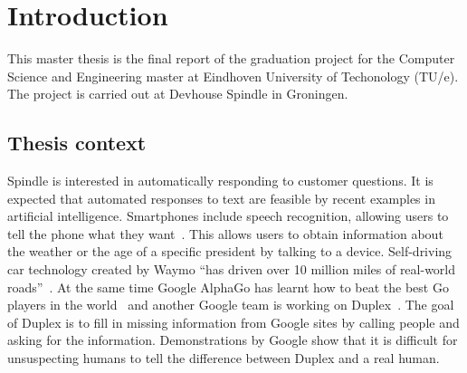 \chapter{Introduction}
\label{ch:introduction}

\setcounter{page}{0}
This master thesis is the final report of the graduation project for the Computer Science and Engineering master at Eindhoven University of Techonology (TU/e).
The project is carried out at Devhouse Spindle in Groningen.

\section{Thesis context}
\label{sec:thesis_context}
Spindle is interested in automatically responding to customer questions.
It is expected that automated responses to text are feasible by recent examples in artificial intelligence.
Smartphones include speech recognition, allowing users to tell the phone what they want~\citep{lopez2017alexa}.
This allows users to obtain information about the weather or the age of a specific president by talking to a device.
Self-driving car technology created by Waymo ``has driven over 10 million miles of real-world roads''~\citep{waymo2018}.
At the same time Google AlphaGo has learnt how to beat the best Go players in the world~\citep{gibney2016google} and another Google team is working on Duplex~\citep{leviathan2018google}.
The goal of Duplex is to fill in missing information from Google sites by calling people and asking for the information.
Demonstrations by Google show that it is difficult for unsuspecting humans to tell the difference between Duplex and a real human.

\iffalse
Remarkable about the context is the speed in which the field evolves.
Learning about some scientific topic means picking up a recent book or review paper.

For example, Stanford provides a `Deep Learning for Natural Language Processing' course.
This course is given bij Christopher Manning who has been active in natural language processing for many years and is highly cited in the field.
When comparing the material of the `Winter 2018' version with the `Winter 2017' we see many changes.
Attention and transformer models~\citep{vaswani2017attention} now get three lectures instead of one.
This could be a coincidence where last year has been a particularly interesting one.

Looking at the years before it does not seem to be so.
A recent review paper for the same field~\citep{young2018recent} still see lots of potential.
They expect better models for unlabelled data, reinforcement learning, zero-shot learning and network memory enrichment via knowledge base.
\fi

